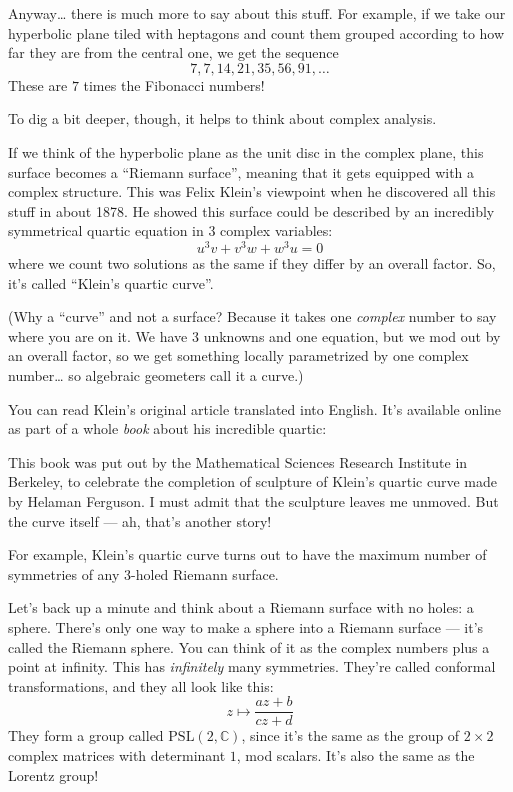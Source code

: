\documentclass{article}
\def\tightlist{}
\renewcommand{\texttt}[1]{%
  \begingroup
  \ttfamily
  \begingroup\lccode`~=`/\lowercase{\endgroup\def~}{/\discretionary{}{}{}}%
  \begingroup\lccode`~=`[\lowercase{\endgroup\def~}{[\discretionary{}{}{}}%
  \begingroup\lccode`~=`.\lowercase{\endgroup\def~}{.\discretionary{}{}{}}%
  \catcode`/=\active\catcode`[=\active\catcode`.=\active
  \scantokens{#1\noexpand}%
  \endgroup
}
\begin{document}
Anyway\ldots{} there is much more to say about this stuff. For example,
if we take our hyperbolic plane tiled with heptagons and count them
grouped according to how far they are from the central one, we get the
sequence \[7, 7, 14, 21, 35, 56, 91, \ldots\] These are \(7\) times the
Fibonacci numbers!

To dig a bit deeper, though, it helps to think about complex analysis.

If we think of the hyperbolic plane as the unit disc in the complex
plane, this surface becomes a ``Riemann surface'', meaning that it gets
equipped with a complex structure. This was Felix Klein's viewpoint when
he discovered all this stuff in about 1878. He showed this surface could
be described by an incredibly symmetrical quartic equation in 3 complex
variables: \[u^3 v + v^3 w + w^3 u = 0\] where we count two solutions as
the same if they differ by an overall factor. So, it's called ``Klein's
quartic curve''.

(Why a ``curve'' and not a surface? Because it takes one \emph{complex}
number to say where you are on it. We have 3 unknowns and one equation,
but we mod out by an overall factor, so we get something locally
parametrized by one complex number\ldots{} so algebraic geometers call
it a curve.)

You can read Klein's original article translated into English. It's
available online as part of a whole \emph{book} about his incredible
quartic:


This book was put out by the Mathematical Sciences Research Institute in
Berkeley, to celebrate the completion of sculpture of Klein's quartic
curve made by Helaman Ferguson. I must admit that the sculpture leaves
me unmoved. But the curve itself --- ah, that's another story!

For example, Klein's quartic curve turns out to have the maximum number
of symmetries of any 3-holed Riemann surface.

Let's back up a minute and think about a Riemann surface with no holes:
a sphere. There's only one way to make a sphere into a Riemann surface
--- it's called the Riemann sphere. You can think of it as the complex
numbers plus a point at infinity. This has \emph{infinitely} many
symmetries. They're called conformal transformations, and they all look
like this: \[z\mapsto\frac{az+b}{cz+d}\] They form a group called
\(\mathrm{PSL}(2,\mathbb{C})\), since it's the same as the group of
\(2\times2\) complex matrices with determinant \(1\), mod scalars. It's
also the same as the Lorentz group!
\end{document}

